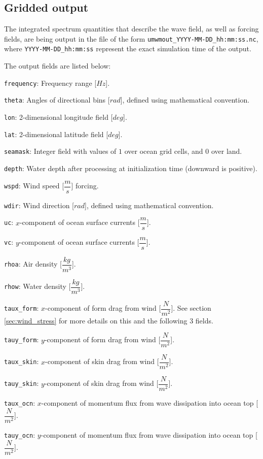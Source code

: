 \documentclass[letterpaper]{article}
\numberwithin{equation}{section}
\begin{document}
\subsection{Gridded output}

The integrated spectrum quantities that describe the wave field,
as well as forcing fields, are being output in the file of the form
\verb+umwmout_YYYY-MM-DD_hh:mm:ss.nc+, where \verb+YYYY-MM-DD_hh:mm:ss+
represent the exact simulation time of the output.

The output fields are listed below:

\verb+frequency+: 
Frequency range [$Hz$].

\verb+theta+:
Angles of directional bins [$rad$], defined using mathematical convention.

\verb+lon+:
2-dimensional longitude field [$deg$].

\verb+lat+:
2-dimensional latitude field [$deg$].

\verb+seamask+:
Integer field with values of $1$ over ocean grid cells, and $0$ over land.

\verb+depth+:
Water depth after processing at initialization time (downward is positive). 

\verb+wspd+:
Wind speed [$\dfrac{m}{s}$] forcing.

\verb+wdir+:
Wind direction [$rad$], defined using mathematical convention.

\verb+uc+:
$x$-component of ocean surface currents [$\dfrac{m}{s}$].

\verb+vc+:
$y$-component of ocean surface currents [$\dfrac{m}{s}$].

\verb+rhoa+:
Air density [$\dfrac{kg}{m^{3}}$].

\verb+rhow+:
Water density [$\dfrac{kg}{m^{3}}$].

\verb+taux_form+:
$x$-component of form drag from wind [$\dfrac{N}{m^{2}}$].
See section \ref{sec:wind_stress} for more details 
on this and the following 3 fields.

\verb+tauy_form+:
$y$-component of form drag from wind [$\dfrac{N}{m^{2}}$].

\verb+taux_skin+:
$x$-component of skin drag from wind [$\dfrac{N}{m^{2}}$].

\verb+tauy_skin+:
$y$-component of skin drag from wind [$\dfrac{N}{m^{2}}$].

\verb+taux_ocn+:
$x$-component of momentum flux from wave dissipation 
into ocean top [$\dfrac{N}{m^{2}}$].

\verb+tauy_ocn+:
$y$-component of momentum flux from wave dissipation 
into ocean top [$\dfrac{N}{m^{2}}$].
\end{document}

